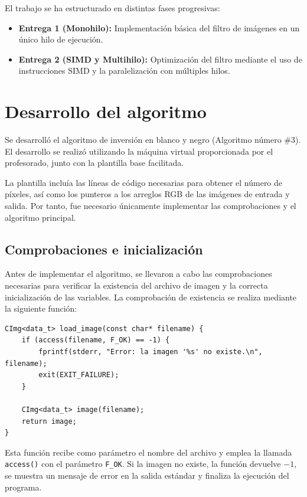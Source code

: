 \documentclass[11pt,a4paper]{article}
\begin{document}
\noindent El trabajo se ha estructurado en distintas fases progresivas:
\begin{itemize}
    \item \textbf{Entrega 1 (Monohilo):} Implementación básica del filtro de imágenes en un único hilo de ejecución.
    \item \textbf{Entrega 2 (SIMD y Multihilo):} Optimización del filtro mediante el uso de instrucciones SIMD y la paralelización con múltiples hilos.
\end{itemize}
\vspace{3ex}

\section{Desarrollo del algoritmo}
Se desarrolló el algoritmo de inversión en blanco y negro (Algoritmo número \#3). El desarrollo se realizó utilizando la máquina virtual proporcionada por el profesorado, junto con la plantilla base facilitada.\vspace{2ex}

La plantilla incluía las líneas de código necesarias para obtener el número de píxeles, así como los punteros a los arreglos RGB de las imágenes de entrada y salida. Por tanto, fue necesario únicamente implementar las comprobaciones y el algoritmo principal.

\subsection{Comprobaciones e inicialización}
Antes de implementar el algoritmo, se llevaron a cabo las comprobaciones necesarias para verificar la existencia del archivo de imagen y la correcta inicialización de las variables. La comprobación de existencia se realiza mediante la siguiente función:

\begin{lstlisting}[style=cppStyle]
CImg<data_t> load_image(const char* filename) {
    if (access(filename, F_OK) == -1) {
        fprintf(stderr, "Error: la imagen '%s' no existe.\n", filename);
        exit(EXIT_FAILURE);
    }

    CImg<data_t> image(filename); 
    return image;
}
\end{lstlisting}

Esta función recibe como parámetro el nombre del archivo y emplea la llamada \texttt{access()} con el parámetro \texttt{F\_OK}. Si la imagen no existe, la función devuelve \(-1\), se muestra un mensaje de error en la salida estándar y finaliza la ejecución del programa.\vspace{2ex}
\end{document}
